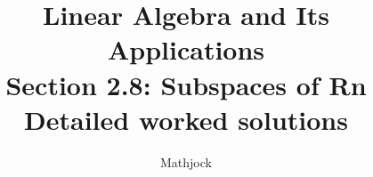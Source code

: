 
\title{\textbf{Linear Algebra and Its Applications}\\[0.3em]Section 2.8: Subspaces of Rn\\[0.3em]\large Detailed worked solutions}
\author{Mathjock}
\date{}

\maketitle
\bookinfo
\tableofcontents
\clearpage
\renewcommand{\thesection}{2.\arabic{section}}
\renewcommand{\theHsection}{2.\arabic{section}}
\setcounter{section}{7}


